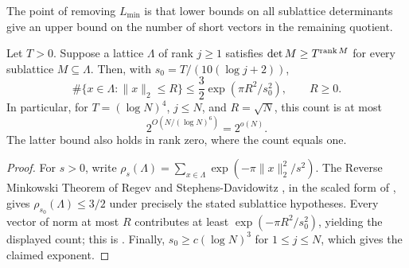 The point of removing \(L_{\min}\) is that lower bounds on all
sublattice determinants give an upper bound on the number of short
vectors in the remaining quotient.

\begin{lemma}\label{lem:projected-count}
Let \(T>0\). Suppose a lattice \(\Lambda\) of rank \(j\ge1\) satisfies
\(\det M\ge T^{\operatorname{rank} M}\) for every sublattice \(M\subseteq\Lambda\).
Then, with \(s_0=T/(10(\log j+2))\),
\[
 \#\{x\in\Lambda:\lVert x\rVert_2\le R\}
 \le \frac32\exp(\pi R^2/s_0^2),\qquad R\ge0.
\]
In particular, for \(T=(\log N)^4\), \(j\le N\), and \(R=\sqrt N\),
this count is at most
\[
 2^{O(N/(\log N)^6)}=2^{o(N)}.
\]
The latter bound also holds in rank zero, where the count equals one.
\end{lemma}

\begin{proof}
For \(s>0\), write
\(\rho_s(\Lambda)=\sum_{x\in\Lambda}
\exp(-\pi\lVert x\rVert_2^2/s^2)\).
The Reverse Minkowski Theorem of Regev and Stephens-Davidowitz
\cite[Theorem~1.2]{ReverseMinkowski}, in the scaled form of
\cite[Theorem~3.4]{SymmetricRate}, gives
\(\rho_{s_0}(\Lambda)\le3/2\) under precisely the stated sublattice
hypotheses. Every vector of norm at most \(R\) contributes at least
\(\exp(-\pi R^2/s_0^2)\), yielding the displayed count; this is
\cite[Lemma~3.5]{SymmetricRate}. Finally,
\(s_0\ge c(\log N)^3\) for \(1\le j\le N\), which gives the claimed
exponent.
\end{proof}
